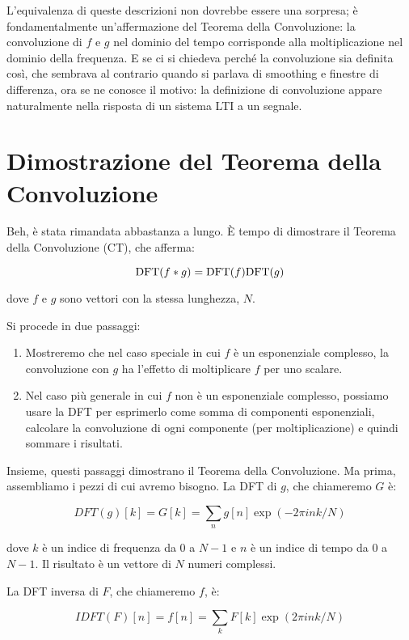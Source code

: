 \documentclass[12pt]{book} \usepackage[width=5.5in,height=8.5in, hmarginratio=3:2,vmarginratio=1:1]{geometry}
\begin{document}
L'equivalenza di queste descrizioni non dovrebbe essere una sorpresa; è fondamentalmente un'affermazione del Teorema della Convoluzione: la convoluzione di $f$ e $g$ nel dominio del tempo corrisponde alla moltiplicazione nel dominio della frequenza. E se ci si chiedeva perché la convoluzione sia definita così, che sembrava al contrario quando si parlava di smoothing e finestre di differenza, ora se ne conosce il motivo: la definizione di convoluzione appare naturalmente nella risposta di un sistema LTI a un segnale.

\section{Dimostrazione del Teorema della Convoluzione} 

Beh, è stata rimandata abbastanza a lungo. È tempo di dimostrare il Teorema della Convoluzione (CT), che afferma:

\[ \mathrm{DFT}(f \ast g) = \mathrm{DFT}(f) \mathrm{DFT}(g) \] 

dove $f$ e $g$ sono vettori con la stessa lunghezza, $N$.

Si procede in due passaggi:

\begin{enumerate} 

\item Mostreremo che nel caso speciale in cui $f$ è un esponenziale complesso, la convoluzione con $g$ ha l'effetto di moltiplicare $f$ per uno scalare.

\item Nel caso più generale in cui $f$ non è un esponenziale complesso, possiamo usare la DFT per esprimerlo come somma di componenti esponenziali, calcolare la convoluzione di ogni componente (per moltiplicazione) e quindi sommare i risultati.

\end{enumerate} 

Insieme, questi passaggi dimostrano il Teorema della Convoluzione. Ma prima, assembliamo i pezzi di cui avremo bisogno. La DFT di $g$, che chiameremo $G$ è:

%
\[ DFT(g)[k] = G[k] = \sum_n g[n] \exp(-2 \pi i n k / N) \] 

%
dove $k$ è un indice di frequenza da 0 a $N-1$ e $n$ è un indice di tempo da 0 a $N-1$. Il risultato è un vettore di $N$ numeri complessi.

La DFT inversa di $F$, che chiameremo $f$, è:

%
\[ IDFT(F)[n] = f[n] = \sum_k F[k] \exp(2 \pi i n k / N) \] 
\end{document}
